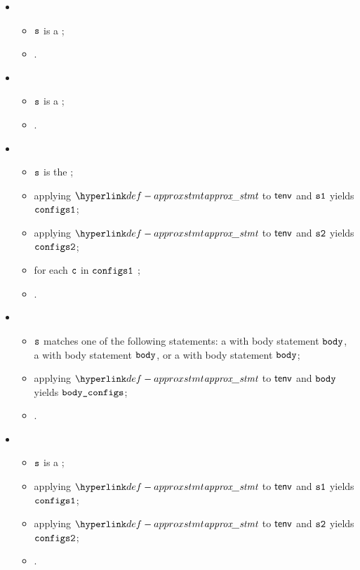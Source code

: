 \begin{itemize}
  \item {}
  \begin{itemize}
    \item $\texttt{s}$ is a \returnstatementsterm;
    \item {}.
  \end{itemize}

  \item {}
  \begin{itemize}
    \item $\texttt{s}$ is a \throwstatementsterm;
    \item  {}.
  \end{itemize}

  \item {}
  \begin{itemize}
    \item $\texttt{s}$ is the \sequencingstatement{$\vsone$}{$\vstwo$};
    \item applying $\approxstmt$ to $\textsf{tenv}$ and $\vsone$ yields $\texttt{configs1}$;
    \item applying $\approxstmt$ to $\textsf{tenv}$ and $\vstwo$ yields $\texttt{configs2}$;
    \item for each \Proseabstractconfiguration{} $\texttt{c}$ in $\texttt{configs1}$ ;
    \item {}.
  \end{itemize}

  \item {}
  \begin{itemize}
    \item $\texttt{s}$ matches one of the following statements: a \repeatstatementsterm{} with body statement $\texttt{body}$,
          a \forstatementterm{} with body statement $\texttt{body}$, or a \whilestatementterm{} with body statement $\texttt{body}$;
    \item applying $\approxstmt$ to $\textsf{tenv}$ and $\texttt{body}$ yields $\texttt{body\_configs}$;
    \item {}.
  \end{itemize}

  \item {}
  \begin{itemize}
    \item $\texttt{s}$ is a \conditionalstatement{$\Ignore$}{$\vsone$}{$\vstwo$};
    \item applying $\approxstmt$ to $\textsf{tenv}$ and $\vsone$ yields $\texttt{configs1}$;
    \item applying $\approxstmt$ to $\textsf{tenv}$ and $\vstwo$ yields $\texttt{configs2}$;
    \item {}.
  \end{itemize}


\end{itemize}
